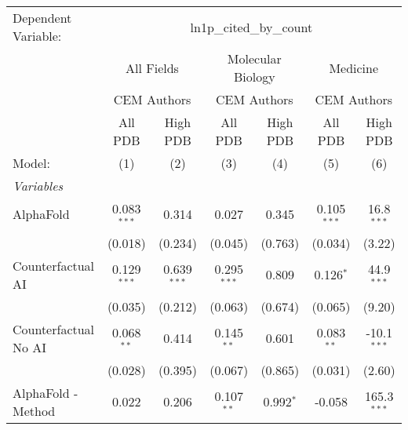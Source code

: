 \begingroup
\centering
\begin{tabular}{lcccccc}
   \tabularnewline \midrule \midrule
   Dependent Variable: & \multicolumn{6}{c}{ln1p\_cited\_by\_count}\\
 & \multicolumn{2}{c}{All Fields} & \multicolumn{2}{c}{Molecular Biology} & \multicolumn{2}{c}{Medicine} \\
\cmidrule(lr){2-3} \cmidrule(lr){4-5} \cmidrule(lr){6-7}
 & \multicolumn{2}{c}{CEM Authors} & \multicolumn{2}{c}{CEM Authors} & \multicolumn{2}{c}{CEM Authors} \\
\cmidrule(lr){2-3} \cmidrule(lr){4-5} \cmidrule(lr){6-7}
 & \multicolumn{1}{c}{All PDB} & \multicolumn{1}{c}{High PDB} & \multicolumn{1}{c}{All PDB} & \multicolumn{1}{c}{High PDB} & \multicolumn{1}{c}{All PDB} & \multicolumn{1}{c}{High PDB} \\
\cmidrule(lr){2-2} \cmidrule(lr){3-3} \cmidrule(lr){4-4} \cmidrule(lr){5-5} \cmidrule(lr){6-6} \cmidrule(lr){7-7}
   Model:                                                     & (1)           & (2)           & (3)           & (4)         & (5)           & (6)\\  
   \midrule
   \emph{Variables}\\
   AlphaFold                                                  & 0.083$^{***}$ & 0.314         & 0.027         & 0.345       & 0.105$^{***}$ & 16.8$^{***}$\\   
                                                              & (0.018)       & (0.234)       & (0.045)       & (0.763)     & (0.034)       & (3.22)\\   
   Counterfactual AI                                          & 0.129$^{***}$ & 0.639$^{***}$ & 0.295$^{***}$ & 0.809       & 0.126$^{*}$   & 44.9$^{***}$\\   
                                                              & (0.035)       & (0.212)       & (0.063)       & (0.674)     & (0.065)       & (9.20)\\   
   Counterfactual No AI                                       & 0.068$^{**}$  & 0.414         & 0.145$^{**}$  & 0.601       & 0.083$^{**}$  & -10.1$^{***}$\\   
                                                              & (0.028)       & (0.395)       & (0.067)       & (0.865)     & (0.031)       & (2.60)\\   
   AlphaFold - Method                                         & 0.022         & 0.206         & 0.107$^{**}$  & 0.992$^{*}$ & -0.058        & 165.3$^{***}$\\   

\end{tabular}
